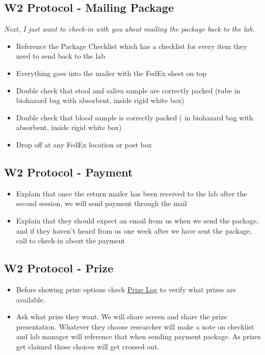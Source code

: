 \documentclass[
]{book}
\providecommand{\tightlist}{%
  \setlength{\itemsep}{0pt}\setlength{\parskip}{0pt}}
\begin{document}
\hypertarget{w2-protocol---mailing-package}{%
\subsection{W2 Protocol - Mailing Package}\label{w2-protocol---mailing-package}}

\emph{Next, I just want to check-in with you about mailing the package back to the lab.}

\begin{itemize}
\item
  Reference the Package Checklist which has a checklist for every item they need to send back to the lab
\item
  Everything goes into the mailer with the FedEx sheet on top
\item
  Double check that stool and saliva sample are correctly packed (tube in biohazard bag with absorbent, inside rigid white box)
\item
  Double check that blood sample is correctly packed ( in biohazard bag with absorbent, inside rigid white box)
\item
  Drop off at any FedEx location or post box
\end{itemize}

\hypertarget{w2-protocol---payment}{%
\subsection{W2 Protocol - Payment}\label{w2-protocol---payment}}

\begin{itemize}
\item
  Explain that once the return mailer has been received to the lab after the second session, we will send payment through the mail
\item
  Explain that they should expect an email from us when we send the package, and if they haven't heard from us one week after we have sent the package, call to check-in about the payment
\end{itemize}

\hypertarget{w2-protocol---prize}{%
\subsection{W2 Protocol - Prize}\label{w2-protocol---prize}}

\begin{itemize}
\tightlist
\item
  Before showing prize options check \href{https://app.box.com/file/734579293509}{Prize Log} to verify what prizes are available.
\item
  Ask what prize they want. We will share screen and share the prize presentation. Whatever they choose researcher will make a note on checklist and lab manager will reference that when sending payment package. As prizes get claimed those choices will get crossed out.
\end{itemize}
\end{document}
